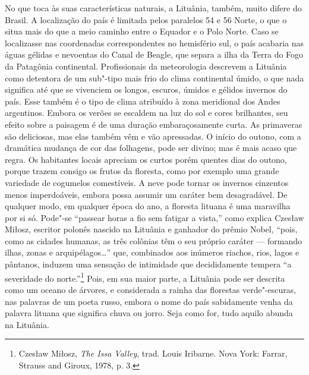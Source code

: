 No que toca às suas características naturais, a Lituânia, também, muito
difere do Brasil. A localização do país é limitada pelos paralelos 54 e
56 Norte, o que o situa mais do que a meio caminho entre o Equador e o
Polo Norte. Caso se localizasse nas coordenadas correspondentes no
hemisfério sul, o país acabaria nas águas gélidas e nevoentas do Canal
de Beagle, que separa a ilha da Terra do Fogo da Patagônia continental.
Profissionais da meteorologia descrevem a Lituânia como detentora de um
sub"-tipo mais frio do clima continental úmido, o que nada significa até
que se vivenciem os longos, escuros, úmidos e gélidos invernos do país.
Esse também é o tipo de clima atribuído à zona meridional dos Andes
argentinos. Embora os verões se escaldem na luz do sol e cores
brilhantes, seu efeito sobre a paisagem é de uma duração embaraçosamente
curta. As primaveras são deliciosas, mas elas também vêm e vão
apressadas. O início do outono, com a dramática mudança de cor das
folhagens, pode ser divino; mas é mais acaso que regra. Os habitantes
locais apreciam os curtos porém quentes dias do outono, porque trazem
consigo os frutos da floresta, como por exemplo uma grande variedade de
cogumelos comestíveis. A neve pode tornar os invernos cinzentos menos
imperdoáveis, embora possa assumir um caráter bem desagradável. De
qualquer modo, em qualquer época do ano, a floresta lituana é uma
maravilha por si só. Pode"-se ``passear horas a fio sem fatigar a
vista,'' como explica Czesław Miłosz, escritor polonês nascido na
Lituânia e ganhador do prêmio Nobel, ``pois, como as cidades humanas, as
três colônias têm o seu próprio caráter --- formando ilhas, zonas e
arquipélagos\ldots{}'' que, combinados aos inúmeros riachos, rios, lagos
e pântanos, induzem uma sensação de intimidade que decididamente tempera
``a severidade do norte.''\footnote{Czesław Miłosz, \textit{The Issa
  Valley}, trad. Louis Iribarne. Nova York: Farrar, Strauss and
  Giroux, 1978, p. 3.} Pois, em sua maior parte, a Lituânia pode ser
descrita como um oceano de árvores, e considerada a rainha das florestas
verde"-escuras, nas palavras de um poeta russo, embora o nome do país
sabidamente venha da palavra lituana que significa chuva ou jorro. Seja
como for, tudo aquilo abunda na Lituânia.

